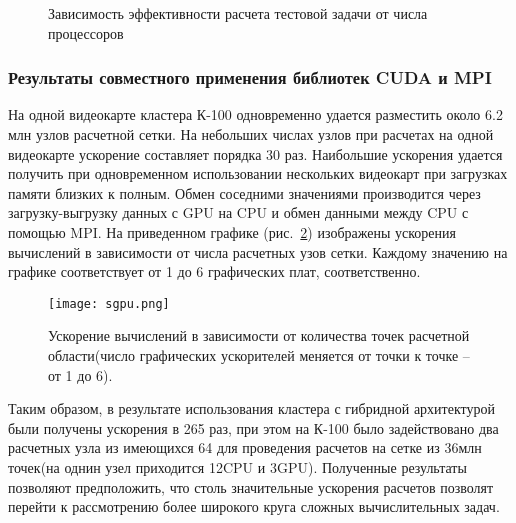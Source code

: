 \begin{figure}
\begin{center}
\caption{Зависимость эффективности расчета тестовой задачи от числа процессоров}
\label{mpi_eff}
\end{center}
\end{figure}


\subsubsection{Результаты совместного применения библиотек CUDA и MPI}
На одной видеокарте кластера К-100 одновременно удается разместить около 6.2 млн узлов
расчетной сетки. На небольших числах узлов при расчетах на одной видеокарте ускорение составляет 
порядка 30 раз. Наибольшие ускорения удается получить при одновременном использовании
нескольких видеокарт при загрузках памяти близких к полным. Обмен соседними значениями
производится через загрузку-выгрузку данных с GPU на CPU и обмен данными между CPU с помощью MPI.
На приведенном графике (рис.~\ref{graph3}) изображены
ускорения вычислений в зависимости от числа расчетных узов сетки. Каждому значению на 
графике соответствует от 1 до 6 графических плат, соответственно.
\begin{figure}[!h]\center
\texttt{[image: sgpu.png]} 
\caption{Ускорение вычислений в зависимости от количества точек расчетной области(число графических ускорителей меняется от точки к точке -- от 1 до 6).}\label{graph3}
\end{figure}

Таким образом, в результате использования кластера с гибридной архитектурой были
получены ускорения в 265 раз, при этом на К-100 было задействовано два расчетных узла 
из имеющихся 64 для проведения расчетов на сетке из 36млн точек(на однин узел
приходится 12CPU и 3GPU).
Полученные результаты позволяют предположить, что столь значительные ускорения
расчетов позволят перейти к рассмотрению более широкого круга сложных
вычислительных задач.
